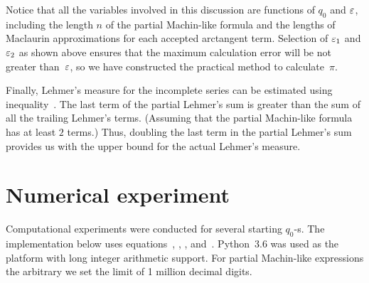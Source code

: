 \documentclass[draft, 10pt]{article} %
\begin{document}
Notice that all the variables involved in this discussion are functions of $q_0$ and $\varepsilon$,
including the length $n$ of the partial Machin-like formula and the lengths of 
Maclaurin approximations for each accepted arctangent term.
Selection of $\varepsilon_1$ and $\varepsilon_2$ as shown above ensures that the maximum
calculation error will be not greater than~$\varepsilon$, so we have constructed the practical
method to calculate~$\pi$.

Finally, Lehmer's measure for the incomplete series can be estimated using
inequality~. The last term of the partial Lehmer's sum is greater than
the sum of all the trailing Lehmer's terms.
(Assuming that the partial Machin-like formula has at least $2$ terms.)
Thus, doubling the last term in the partial Lehmer's sum
provides us with the upper bound for the actual Lehmer's measure.

\section{Numerical experiment}

Computational experiments were conducted for several starting $q_0$-s.
The implementation below uses equations~,
, , and~.
Python~3.6 was used as the platform with long integer arithmetic support.
For partial Machin-like expressions the arbitrary we set the limit of 1 million decimal digits.
\end{document}
